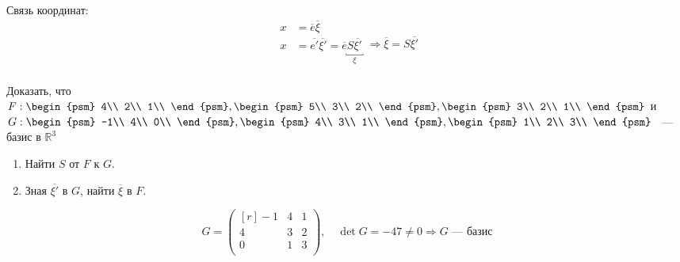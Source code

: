 	Связь координат:
	\begin{equation*}
	\left.
	\begin{aligned}
	x&=\overline{e} \overline{\xi}\\
	x&=\overline{e'}\overline{\xi'}=\overline{e}\underbracket{S\overline{\xi'}}_{\xi}\\
	\end{aligned} 
	\right. \Rightarrow \boxed{\overline{\xi} =S\overline{\xi'}}
	\end{equation*}
	\vspace{3mm}
\begin{prim}	
	Доказать, что $F:\begin{psm}
	4\\
	2\\
	1\\
	\end{psm},\begin{psm}
	5\\
	3\\
	2\\
	\end{psm},\begin{psm}
	3\\
	2\\
	1\\
	\end{psm}$ и $G:\begin{psm}
	-1\\
	4\\
	0\\
	\end{psm},\begin{psm}
	4\\
	3\\
	1\\
	\end{psm},\begin{psm}
	1\\
	2\\
	3\\
	\end{psm}$ ~---~ базис в $\mathbb{R}^3$
	\begin{enumerate}
		\item Найти $S$ от $F$ к $G$.
		\item Зная $\overline{\xi'}$ в $G$, найти $\overline{\xi}$ в $F$.
	\end{enumerate}
\end{prim}
	$$G = \begin{pmatrix*}[r]
	-1 & 4 & 1\\
	4 & 3 & 2\\
	0 & 1 & 3\\
	\end{pmatrix*},\quad \det G =-47 \neq 0 \Rightarrow G \text{ --- базис}$$
